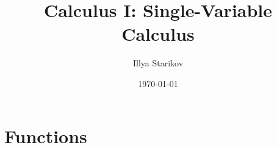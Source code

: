 \documentclass[12pt]{article}
\title{Calculus I: Single-Variable Calculus}
\author{Illya Starikov}
\date{\today}
\begin{document}
\maketitle
\tableofcontents\pagebreak


\section{Functions}











\end{document}
